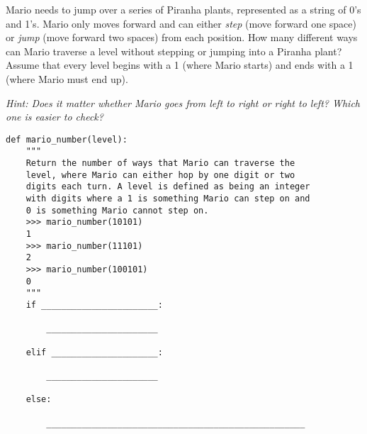 \begin{blocksection}



\question Mario needs to jump over a series of Piranha plants, represented as a
string of 0's and 1's. Mario only moves forward and can
either \emph{step} (move forward one space) or \emph{jump} (move forward two
spaces) from each position. How many different ways can Mario traverse a level
without stepping or jumping into a Piranha plant? Assume that every level begins
with a 1 (where Mario starts) and ends with a 1 (where
Mario must end up).


\textit{Hint: Does it matter whether Mario goes from left to right or right to left? Which
one is easier to check?}

\begin{lstlisting}
def mario_number(level):
    """
    Return the number of ways that Mario can traverse the
    level, where Mario can either hop by one digit or two
    digits each turn. A level is defined as being an integer
    with digits where a 1 is something Mario can step on and 
    0 is something Mario cannot step on. 
    >>> mario_number(10101)
    1
    >>> mario_number(11101)
    2   
    >>> mario_number(100101)
    0
    """
    if _______________________:
		
        ______________________
				
    elif _____________________:
		
        ______________________
				
    else:
		
        ___________________________________________________
\end{lstlisting}
\end{blocksection}

